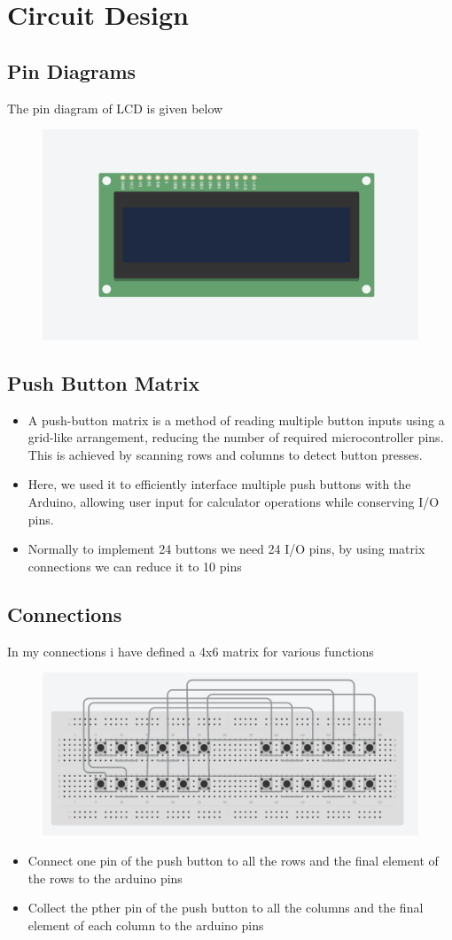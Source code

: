 \documentclass[journal]{IEEEtran}
\begin{document}
\section{Circuit Design }
\subsection{Pin Diagrams}
The pin diagram of LCD is given below 
\begin{figure}[H]
    \centering
    \includegraphics[width=0.5\linewidth]{figs/lcdpin.png}
\end{figure}
\subsection{Push Button Matrix}
\begin{itemize}
\item A push-button matrix is a method of reading multiple button inputs using a grid-like arrangement, reducing the number of required microcontroller pins. This is achieved by scanning rows and columns to detect button presses.
\item Here, we used it to efficiently interface multiple push buttons with the Arduino, allowing user input for calculator operations while conserving I/O pins.
\item Normally to implement 24 buttons we need 24 I/O pins, by using matrix connections we can reduce it to 10 pins 
\end{itemize}
\subsection*{Connections}
In my connections i have defined a 4x6 matrix for various functions 
\begin{figure}[H]
    \centering
    \includegraphics[width=0.7\linewidth]{figs/matrixpin.png}
\end{figure}
\begin{itemize}
    \item Connect one pin of the push button to all the rows and the final element of the rows to the arduino pins 
    \item Collect the pther pin of the push button to all the columns and the final element of each column to the arduino pins 
\end{itemize}
\end{document}

